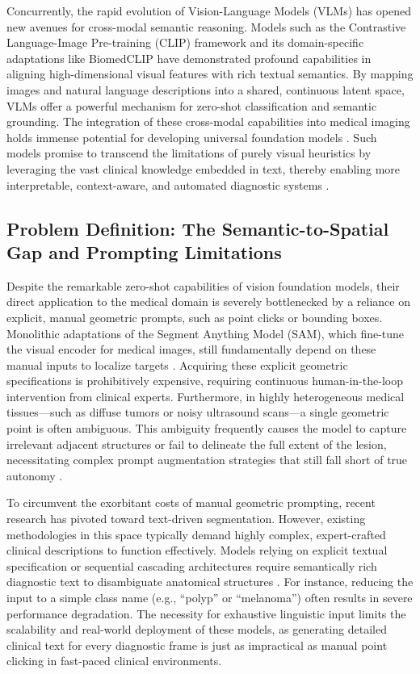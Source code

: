\documentclass[onecolumn]{IEEEtran}
\numberwithin{equation}{section}
\theoremstyle{definition}
\theoremstyle{remark}
\begin{document}
Concurrently, the rapid evolution of Vision-Language Models (VLMs) has opened new avenues for cross-modal semantic reasoning. Models such as the Contrastive Language-Image Pre-training (CLIP) framework \cite{radford2021learning} and its domain-specific adaptations like BiomedCLIP \cite{zhang2025biomedclip} have demonstrated profound capabilities in aligning high-dimensional visual features with rich textual semantics. By mapping images and natural language descriptions into a shared, continuous latent space, VLMs offer a powerful mechanism for zero-shot classification and semantic grounding. The integration of these cross-modal capabilities into medical imaging holds immense potential for developing universal foundation models \cite{lee2024foundation}. Such models promise to transcend the limitations of purely visual heuristics by leveraging the vast clinical knowledge embedded in text, thereby enabling more interpretable, context-aware, and automated diagnostic systems \cite{bommasani2022opportunities}.

\subsection{Problem Definition: The Semantic-to-Spatial Gap and Prompting Limitations}
\label{sec:promising_gaps}

Despite the remarkable zero-shot capabilities of vision foundation models, their direct application to the medical domain is severely bottlenecked by a reliance on explicit, manual geometric prompts, such as point clicks or bounding boxes. Monolithic adaptations of the Segment Anything Model (SAM), which fine-tune the visual encoder for medical images, still fundamentally depend on these manual inputs to localize targets \cite{zhang2023customized, cheng2024unleashing, wu2025medical}. Acquiring these explicit geometric specifications is prohibitively expensive, requiring continuous human-in-the-loop intervention from clinical experts. Furthermore, in highly heterogeneous medical tissues—such as diffuse tumors or noisy ultrasound scans—a single geometric point is often ambiguous. This ambiguity frequently causes the model to capture irrelevant adjacent structures or fail to delineate the full extent of the lesion, necessitating complex prompt augmentation strategies that still fall short of true autonomy \cite{dai2024samaug}.

To circumvent the exorbitant costs of manual geometric prompting, recent research has pivoted toward text-driven segmentation. However, existing methodologies in this space typically demand highly complex, expert-crafted clinical descriptions to function effectively. Models relying on explicit textual specification or sequential cascading architectures require semantically rich diagnostic text to disambiguate anatomical structures \cite{koleilat2025medclip, wang2022medclip, li2024clipsam}. For instance, reducing the input to a simple class name (e.g., ``polyp'' or ``melanoma'') often results in severe performance degradation. The necessity for exhaustive linguistic input limits the scalability and real-world deployment of these models, as generating detailed clinical text for every diagnostic frame is just as impractical as manual point clicking in fast-paced clinical environments.
\end{document}
